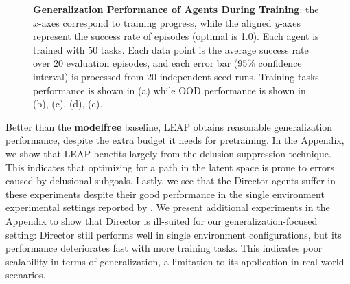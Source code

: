 \begin{figure*}[htbp]
\centering
\vspace*{-5mm}
\hfill
{}
\hfill
{}
\hfill
{}
\hfill
{}

\caption{\small \textbf{Generalization Performance of Agents During Training}: the $x$-axes correspond to training progress, while the aligned $y$-axes represent the success rate of episodes (optimal is 1.0). Each agent is trained with $50$ tasks. Each data point is the average success rate over $20$ evaluation episodes, and each error bar (95\% confidence interval) is processed from $20$ independent seed runs. Training tasks performance is shown in (a) while OOD performance is shown in (b), (c), (d), (e). }
\label{fig:50_envs}
\end{figure*}

Better than the \textbf{modelfree} baseline, LEAP obtains reasonable generalization performance, despite the extra budget it needs for pretraining. In the Appendix, we show that LEAP benefits largely from the delusion suppression technique. This indicates that optimizing for a path in the latent space is prone to errors caused by delusional subgoals. Lastly, we see that the Director agents suffer in these experiments despite their good performance in the single environment experimental settings reported by \citet{hafner2022deep}. We present additional experiments in the Appendix to show that Director is ill-suited for our generalization-focused setting:  Director still performs well in single environment configurations, but its performance deteriorates fast with more training tasks. This indicates poor scalability in terms of generalization, a limitation to its application in real-world scenarios. %


